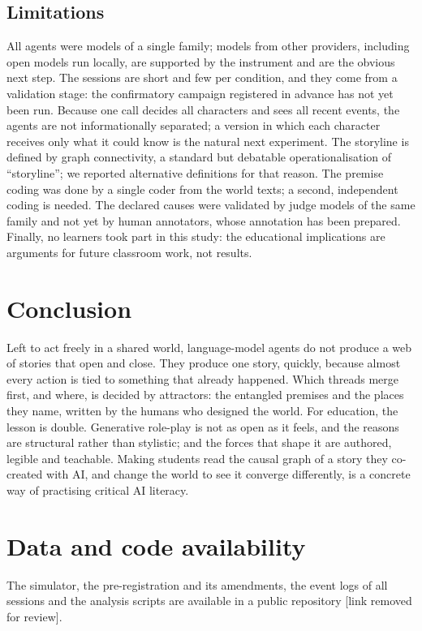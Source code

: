 \documentclass[12pt]{article}
\begin{document}
\subsection{Limitations}

All agents were models of a single family; models from other providers,
including open models run locally, are supported by the instrument and are
the obvious next step. The sessions are short and few per condition, and
they come from a validation stage: the confirmatory campaign registered in
advance has not yet been run. Because one call decides all characters
and sees all recent events, the agents are not informationally separated;
a version in which each character receives only what it could know is the
natural next experiment. The storyline is defined by graph
connectivity, a standard but debatable operationalisation of
\enquote{storyline}; we reported alternative definitions for that reason. The
premise coding was done by a single coder from the world texts; a second,
independent coding is needed. The declared causes were validated by judge
models of the same family and not yet by human annotators, whose annotation
has been prepared. Finally, no learners took part in this study: the
educational implications are arguments for future classroom work, not
results.

\section{Conclusion}

Left to act freely in a shared world, language-model agents do not produce a
web of stories that open and close. They produce one story, quickly, because
almost every action is tied to something that already happened. Which threads
merge first, and where, is decided by attractors: the entangled premises and
the places they name, written by the humans who designed the world. For
education, the lesson is double. Generative role-play is not as open as it
feels, and the reasons are structural rather than stylistic; and the forces
that shape it are authored, legible and teachable. Making students read the
causal graph of a story they co-created with AI, and change the world to see
it converge differently, is a concrete way of practising critical AI
literacy.

\section*{Data and code availability}
The simulator, the pre-registration and its amendments, the event logs of all
sessions and the analysis scripts are available in a public repository
[link removed for review].

\printbibliography
\end{document}
